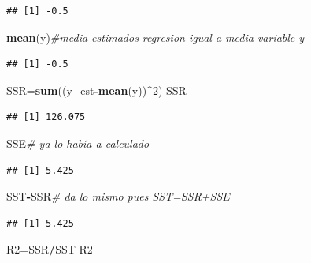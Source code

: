 \documentclass[
]{article}
\newenvironment{Shaded}{\begin{snugshade}}{\end{snugshade}}
\newcommand{\CommentTok}[1]{\textcolor[rgb]{0.56,0.35,0.01}{\textit{#1}}}
\newcommand{\DecValTok}[1]{\textcolor[rgb]{0.00,0.00,0.81}{#1}}
\newcommand{\KeywordTok}[1]{\textcolor[rgb]{0.13,0.29,0.53}{\textbf{#1}}}
\newcommand{\NormalTok}[1]{#1}
\newcommand{\OperatorTok}[1]{\textcolor[rgb]{0.81,0.36,0.00}{\textbf{#1}}}
\begin{document}
\begin{verbatim}
## [1] -0.5
\end{verbatim}

\begin{Shaded}
\begin{Highlighting}[]
\KeywordTok{mean}\NormalTok{(y)}\CommentTok{\#media estimados regresion igual a media variable y}
\end{Highlighting}
\end{Shaded}

\begin{verbatim}
## [1] -0.5
\end{verbatim}

\begin{Shaded}
\begin{Highlighting}[]
\NormalTok{SSR=}\KeywordTok{sum}\NormalTok{((y\_est}\OperatorTok{{-}}\KeywordTok{mean}\NormalTok{(y))}\OperatorTok{\^{}}\DecValTok{2}\NormalTok{)}
\NormalTok{SSR}
\end{Highlighting}
\end{Shaded}

\begin{verbatim}
## [1] 126.075
\end{verbatim}

\begin{Shaded}
\begin{Highlighting}[]
\NormalTok{SSE}\CommentTok{\# ya lo había a calculado}
\end{Highlighting}
\end{Shaded}

\begin{verbatim}
## [1] 5.425
\end{verbatim}

\begin{Shaded}
\begin{Highlighting}[]
\NormalTok{SST}\OperatorTok{{-}}\NormalTok{SSR}\CommentTok{\# da lo mismo pues SST=SSR+SSE }
\end{Highlighting}
\end{Shaded}

\begin{verbatim}
## [1] 5.425
\end{verbatim}

\begin{Shaded}
\begin{Highlighting}[]
\NormalTok{R2=SSR}\OperatorTok{/}\NormalTok{SST}
\NormalTok{R2}
\end{Highlighting}
\end{Shaded}
\end{document}
